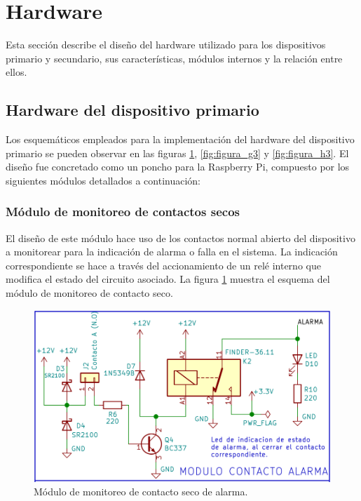 \newpage

\section{Hardware}

Esta sección describe el  diseño del hardware utilizado para los dispositivos primario y secundario, sus características, módulos internos y la relación entre ellos.

\subsection{Hardware del dispositivo primario}

Los esquemáticos empleados para la implementación del hardware del dispositivo primario se pueden observar en las figuras \ref{fig:figura_f3}, \ref{fig:figura_g3} y \ref{fig:figura_h3}. El diseño fue concretado como un poncho para la Raspberry Pi, compuesto por los siguientes módulos detallados a continuación:

\subsubsection{Módulo de monitoreo de contactos secos}

El diseño de este módulo hace uso de los contactos normal abierto del dispositivo a monitorear para la indicación de alarma o falla en el sistema. La indicación correspondiente se hace a través del accionamiento de un relé interno que modifica el estado del circuito asociado.
La figura \ref{fig:figura_f3} muestra el esquema del módulo de monitoreo de contacto seco.

\begin{figure}[]
	\centering
	\includegraphics[scale=.35]{./Figures/Capitulo3/Fig_F3.png}
	\caption{Módulo de monitoreo de contacto seco de alarma.}
	\label{fig:figura_f3}
\end{figure} 

